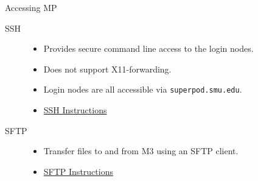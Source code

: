 \begin{frame}{Accessing MP}
\begin{description}
\item[SSH]
\begin{itemize}
  \item Provides secure command line access to the login nodes.
  \item Does not support X11-forwarding.
  \item Login nodes are all accessible via \texttt{superpod.smu.edu}.
  \item \href{https://southernmethodistuniversity.github.io/hpc_docs/access.html}{SSH Instructions}
\end{itemize}
\item[SFTP]
\begin{itemize}
  \item Transfer files to and from M3 using an SFTP client.
  \item \href{https://southernmethodistuniversity.github.io/hpc_docs/access.html}{SFTP Instructions}
\end{itemize}
\end{description}
\end{frame}

